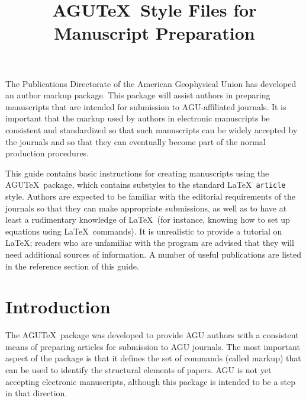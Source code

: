 

\setcounter{secnumdepth}{4}


\twocolumn
\title{AGU\TeX\ Style Files for Manuscript Preparation}
\vspace{.11in}

The Publications Directorate of the American Geophysical Union 
has developed an author markup package.  This package will assist 
authors in preparing manuscripts that are intended for submission 
to AGU-affiliated journals.  It is important that the markup used 
by authors in electronic manuscripts be consistent and standardized 
so that such manuscripts can be widely accepted by the journals and 
so that they can eventually become part of the normal production 
procedures.

This guide contains basic instructions for creating manuscripts 
using the AGU\TeX\ package, which contains substyles to the 
standard \LaTeX\ {\tt article} style.  Authors are expected to 
be familiar with the editorial requirements of the journals so 
that they can make appropriate submissions, as well as to have 
at least a rudimentary knowledge of \LaTeX\ (for instance, knowing 
how to set up equations using \LaTeX\ commands).  It is unrealistic 
to provide a tutorial on \LaTeX; readers who are unfamiliar with 
the program are advised that they will need additional sources of 
information.  A number of useful publications are listed in 
the reference section of this guide.

\section{Introduction}

The AGU\TeX\ package was developed to provide AGU authors 
with a consistent means of preparing articles for submission 
to AGU journals.  The most important aspect of the package 
is that it defines the set of commands (called markup) that 
can be used to identify the structural elements of papers.  
AGU is not yet accepting electronic manuscripts, although 
this package is intended to be a step in that direction.  

